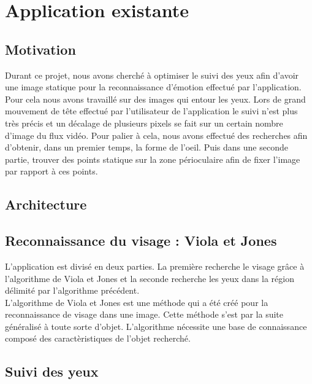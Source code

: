 \section{Application existante}

\subsection{Motivation}
Durant ce projet, nous avons cherché à optimiser le suivi des yeux afin d'avoir une image statique
pour la reconnaissance d'émotion effectué par l'application. Pour cela nous avons travaillé
sur des images qui entour les yeux. Lors de grand mouvement de tête effectué par l'utilisateur
de l'application le suivi n'est plus très précis et un décalage de plusieurs pixels se fait
sur un certain nombre d'image du flux vidéo. Pour palier à cela, nous avons effectué des recherches
afin d'obtenir, dans un premier temps, la forme de l'oeil. Puis dans une seconde partie, trouver 
des points statique sur la zone périoculaire afin de fixer l'image par rapport à ces points.

\subsection{Architecture}

\subsection{Reconnaissance du visage : Viola et Jones}
L'application est divisé en deux parties. La première recherche le visage grâce à
l'algorithme de Viola et Jones et la seconde recherche les yeux dans la région délimité
par l'algorithme précédent.\\

L'algorithme de Viola et Jones est une méthode qui a été créé pour la reconnaissance de visage dans une 
image. Cette méthode s'est par la suite généralisé à toute sorte d'objet. L'algorithme nécessite une 
base de connaissance composé des caractèristiques de l'objet recherché.

\subsection{Suivi des yeux}

